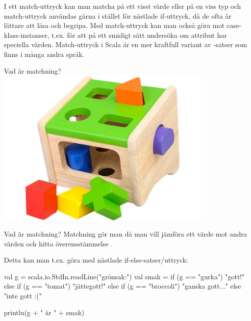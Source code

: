 


\ifkompendium
\noindent  I ett match-uttryck kan man matcha på ett visst värde eller på en viss typ och match-uttryck användas gärna i stället för nästlade if-uttryck, då de ofta är lättare att läsa och begripa. Med match-uttryck kan man också göra  mot case-klass-instanser, t.ex. för att på ett smidigt sätt undersöka om attribut har speciella värden. Match-uttryck i Scala är en mer kraftfull variant av -satser som finns i många andra språk.  
\else
\begin{SlideExtra}{Vad är matchning?}
\includegraphics[width=0.8\textwidth]{../img/plocklada.png}
\end{SlideExtra}
\fi

\begin{Slide}{Vad är matchning?}
Matchning gör man då man vill jämföra ett värde mot andra värden och hitta överensstämmelse .

\pause

\vspace{1em}\noindent Detta kan man t.ex. göra med nästlade if-else-satser/uttryck:

\begin{Code}
val g = scala.io.StdIn.readLine("grönsak:")
val smak =
  if (g == "gurka") "gott!"
  else if (g == "tomat") "jättegott!"
  else if (g == "broccoli") "ganska gott..."
  else "inte gott :("

println(g + " är " + smak)
\end{Code}
\end{Slide}




